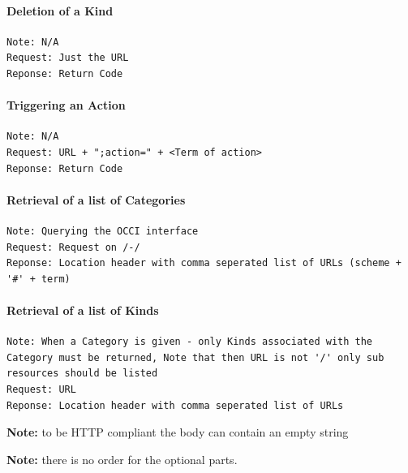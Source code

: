 \documentclass[10pt,a4paper]{article}
\begin{document}
\paragraph{Deletion of a Kind}
\begin{verbatim}
Note: N/A
Request: Just the URL
Reponse: Return Code
\end{verbatim}

\paragraph{Triggering an Action}
\begin{verbatim}
Note: N/A
Request: URL + ";action=" + <Term of action>
Reponse: Return Code
\end{verbatim}

\paragraph{Retrieval of a list of Categories}
\begin{verbatim}
Note: Querying the OCCI interface
Request: Request on /-/
Reponse: Location header with comma seperated list of URLs (scheme + '#' + term)
\end{verbatim}

\paragraph{Retrieval of a list of Kinds}
\begin{verbatim}
Note: When a Category is given - only Kinds associated with the Category must be returned, Note that then URL is not '/' only sub resources should be listed
Request: URL
Reponse: Location header with comma seperated list of URLs
\end{verbatim}

\textbf{Note:} to be HTTP compliant the body can contain an empty string

\textbf{Note:} there is no order for the optional parts.

%



%
%
%
%
%
%
\end{document}
